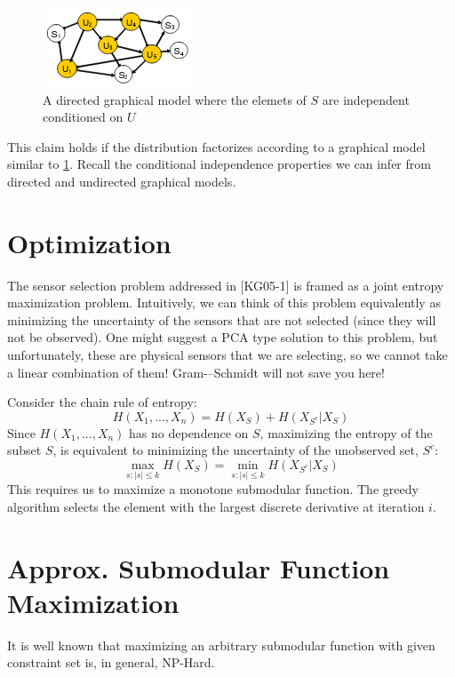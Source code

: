 \documentclass[twoside]{article}
\renewcommand{\cite}[1]{[#1]}
\theoremstyle{definition}
\begin{document}
\begin{figure}[h]
  \centering
  \includegraphics[scale=0.8]{cond_ind.png}
  \caption{A directed graphical model where the elemets of $S$ are
    independent conditioned on $U$}
  \label{fig:ugm}
\end{figure}

This claim holds if the distribution factorizes according to a
graphical model similar to \ref{fig:ugm}. Recall the conditional
independence properties we can infer from directed and undirected graphical
models.

\section{Optimization}
The sensor selection problem addressed in \cite{KG05-1} is framed as
a joint entropy maximization problem. Intuitively, we can think of this
problem equivalently as minimizing the uncertainty of the sensors that
are not selected (since they will not be observed). One might suggest
a PCA type solution to this problem, but unfortunately, these are
physical sensors that we are selecting, so we cannot take a linear
combination of them! Gram-–Schmidt will not save you here!

Consider the chain rule of entropy:
$$H(X_1, ..., X_n) = H(X_S) + H(X_{S^c} | X_S)$$
Since $H(X_1, ..., X_n)$ has no dependence on $S$, maximizing the
entropy of the subset $S$, is equivalent to minimizing the
uncertainty of the unobserved set, $S^c$:
$$\max_{s: |s| \leq k} H(X_S) = \min_{s: |s| \leq k} H(X_{S^c} |
X_S)$$
This requires us to maximize a monotone submodular function. The
greedy algorithm selects the element with the largest discrete
derivative at iteration $i$.


\newpage
\section{Approx. Submodular Function Maximization}


It is well known that maximizing an arbitrary submodular function with
given constraint set is, in general, NP-Hard. %
\end{document}
